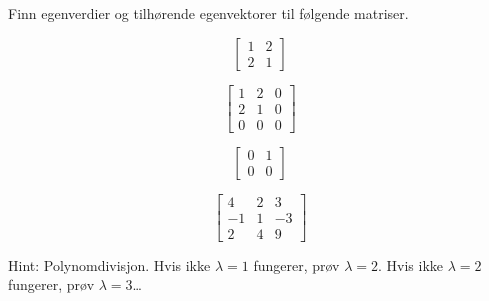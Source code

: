 
\begin{oppgave}

Finn egenverdier og tilhørende egenvektorer til følgende matriser.

\begin{punkt}
$$\begin{bmatrix}
1 & 2\\
2 & 1
\end{bmatrix}$$
\end{punkt}

\begin{punkt}
$$\begin{bmatrix}
1 & 2 & 0\\
2 & 1 & 0\\
0 & 0 & 0
\end{bmatrix}$$
\end{punkt}


\begin{punkt}
$$\begin{bmatrix}
0 & 1 \\
0 & 0 
\end{bmatrix}$$

\end{punkt}


\begin{punkt}
$$\begin{bmatrix}
4 & 2 & 3\\
-1 & 1 & -3\\
2 & 4 & 9
\end{bmatrix}$$

\noindent
Hint: Polynomdivisjon. Hvis ikke $\lambda=1$ fungerer, prøv $\lambda=2$. Hvis ikke $\lambda=2$ fungerer, prøv $\lambda=3$\ldots
\end{punkt}


\end{oppgave}


